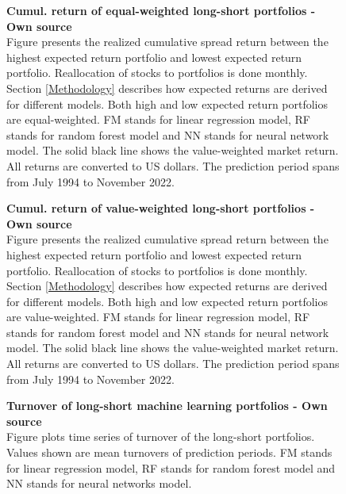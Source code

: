 \documentclass[12pt]{article}
\begin{document}
\begin{appendices}
\begin{figure}[H]
\centering
\caption[Cumulative return of equal-weighted long-short portfolios]{\textbf{Cumul. return of equal-weighted long-short portfolios \textnormal{- Own source}}\\ Figure presents the realized cumulative spread return between the highest expected return portfolio and lowest expected return portfolio. Reallocation of stocks to portfolios is done monthly. Section \ref{Methodology} describes how expected returns are derived for different models. Both high and low expected return portfolios are equal-weighted. FM stands for linear regression model, RF stands for random forest model and NN stands for neural network model. The solid black line shows the value-weighted market return. All returns are converted to US dollars. The prediction period spans from July 1994 to November 2022.}

\label{plot:cumul_ew_LS_portf_return}
\end{figure}

\begin{figure}[H]
\centering
\caption[Cumulative return of value-weighted long-short portfolios]{\textbf{Cumul. return of value-weighted long-short portfolios \textnormal{- Own source}}\\ Figure presents the realized cumulative spread return between the highest expected return portfolio and lowest expected return portfolio. Reallocation of stocks to portfolios is done monthly. Section \ref{Methodology} describes how expected returns are derived for different models. Both high and low expected return portfolios are value-weighted. FM stands for linear regression model, RF stands for random forest model and NN stands for neural network model. The solid black line shows the value-weighted market return. All returns are converted to US dollars. The prediction period spans from July 1994 to November 2022.}

\label{plot:cumul_vw_LS_portf_return}
\end{figure}

\begin{figure}[H]
\centering
\caption[Turnover of long-short machine learning portfolios]{\textbf{Turnover of long-short machine learning portfolios \textnormal{- Own source}}\\ Figure plots time series of turnover of the long-short portfolios. Values shown are mean turnovers of prediction periods. FM stands for linear regression model, RF stands for random forest model and NN stands for neural networks model. }

\label{plot:Turnover}
\end{figure}


\end{appendices}
\end{document}
